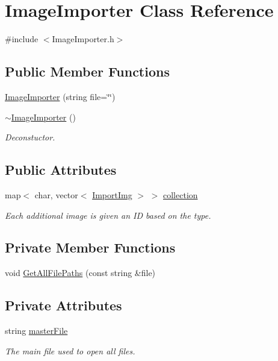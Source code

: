 \hypertarget{classImageImporter}{\section{Image\-Importer Class Reference}
\label{classImageImporter}
}


{\ttfamily \#include $<$Image\-Importer.\-h$>$}

\subsection*{Public Member Functions}
\begin{DoxyCompactItemize}
\item 
\hyperlink{classImageImporter_a66e456e2a48df9e1ccd729d41f81f1b8}{Image\-Importer} (string file=\char`\"{}\char`\"{})
\item 
\hyperlink{classImageImporter_aeb07a2a5d1af993e336ff5bd84217b0c}{$\sim$\-Image\-Importer} ()
\begin{DoxyCompactList}\small\item\em Deconstuctor. \end{DoxyCompactList}\end{DoxyCompactItemize}
\subsection*{Public Attributes}
\begin{DoxyCompactItemize}
\item 
map$<$ char, vector$<$ \hyperlink{classImportImg}{Import\-Img} $>$ $>$ \hyperlink{classImageImporter_a8f0b778e6af2bd36dcda7a35107e4a18}{collection}
\begin{DoxyCompactList}\small\item\em Each additional image is given an I\-D based on the type. \end{DoxyCompactList}\end{DoxyCompactItemize}
\subsection*{Private Member Functions}
\begin{DoxyCompactItemize}
\item 
void \hyperlink{classImageImporter_aed1380088ef265b97ef0aa680ed151f0}{Get\-All\-File\-Paths} (const string \&file)
\end{DoxyCompactItemize}
\subsection*{Private Attributes}
\begin{DoxyCompactItemize}
\item 
string \hyperlink{classImageImporter_ac525acb521f6790cd85877f828fac54c}{master\-File}
\begin{DoxyCompactList}\small\item\em The main file used to open all files. \end{DoxyCompactList}\end{DoxyCompactItemize}


